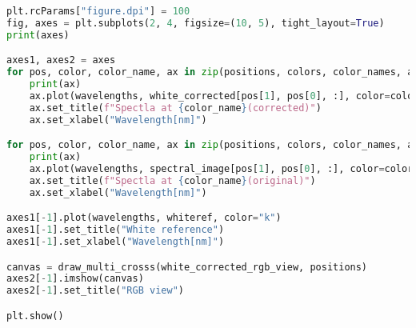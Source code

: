 \begin{lstlisting}[language=python, caption=White correction for Nuance Cmaera with small reference, label={code:wc-nuance-small}]
plt.rcParams["figure.dpi"] = 100
fig, axes = plt.subplots(2, 4, figsize=(10, 5), tight_layout=True)
print(axes)

axes1, axes2 = axes
for pos, color, color_name, ax in zip(positions, colors, color_names, axes2):
    print(ax)
    ax.plot(wavelengths, white_corrected[pos[1], pos[0], :], color=color)
    ax.set_title(f"Spectla at {color_name}(corrected)")
    ax.set_xlabel("Wavelength[nm]")

for pos, color, color_name, ax in zip(positions, colors, color_names, axes1):
    print(ax)
    ax.plot(wavelengths, spectral_image[pos[1], pos[0], :], color=color)
    ax.set_title(f"Spectla at {color_name}(original)")
    ax.set_xlabel("Wavelength[nm]")

axes1[-1].plot(wavelengths, whiteref, color="k")
axes1[-1].set_title("White reference")
axes1[-1].set_xlabel("Wavelength[nm]")

canvas = draw_multi_crosss(white_corrected_rgb_view, positions)
axes2[-1].imshow(canvas)
axes2[-1].set_title("RGB view")

plt.show()
\end{lstlisting}
